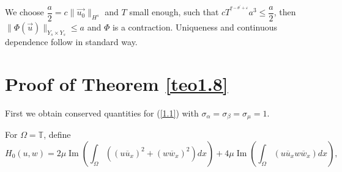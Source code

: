 \documentclass[reqno]{amsart}
\numberwithin{equation}{section}
\begin{document}
We choose $\dfrac{a}{2}=c\| \overrightarrow{u_0}\| _{H^{s}}$ and $T$
small enough, such that $cT^{^{\theta-\theta^{'}+\varepsilon}}a^{3}\leq\dfrac{a}{2}$, then $\|
\Phi(\overrightarrow{u})\| _{Y_{s}\times Y_{s} }\leq a$
and $\Phi$ is a contraction. Uniqueness and continuous dependence follow in standard way.

\section{Proof of Theorem \ref{teo1.8}}

First we obtain conserved quantities for (\ref{1.1}) with $\sigma_{\alpha}=\sigma_{\beta}=\sigma_{\mu}=1$.

For $\Omega=\mathbb{T}$, define
\[
H_{0}(u,w)=2\mu\operatorname{Im}\left(  \int_{\Omega}((u\overline{u}_{x})^{2}+(w\overline{w}_{x})^{2})dx\right)
+4\mu\operatorname{Im}\left(
\int_{\Omega}(u\overline{u}_{x}w\overline{w}_{x})dx\right)  \text{,}\]
\end{document}
